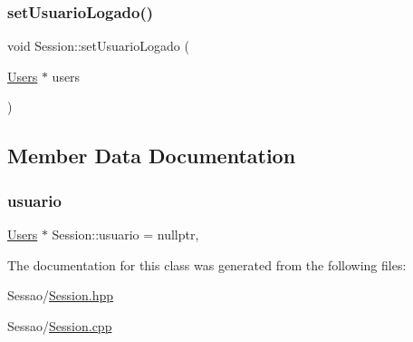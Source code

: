 \mbox{\label{class_session_acefef4227ca35a5f2661c29deb535e40}} 
\subsubsection{\texorpdfstring{set\+Usuario\+Logado()}{setUsuarioLogado()}}
{\footnotesize\ttfamily void Session\+::set\+Usuario\+Logado (\begin{DoxyParamCaption}\item[{\hyperlink{class_users}{Users} $\ast$}]{users }\end{DoxyParamCaption})\hspace{0.3cm}{\ttfamily [static]}}



\subsection{Member Data Documentation}
\mbox{\label{class_session_ab20e9b5ce783a5539dd56f486ac5e277}} 
\subsubsection{\texorpdfstring{usuario}{usuario}}
{\footnotesize\ttfamily \hyperlink{class_users}{Users} $\ast$ Session\+::usuario = nullptr\hspace{0.3cm}{\ttfamily [static]}, {\ttfamily [private]}}



The documentation for this class was generated from the following files\+:\begin{DoxyCompactItemize}
\item 
Sessao/\hyperlink{_session_8hpp}{Session.\+hpp}\item 
Sessao/\hyperlink{_session_8cpp}{Session.\+cpp}\end{DoxyCompactItemize}
